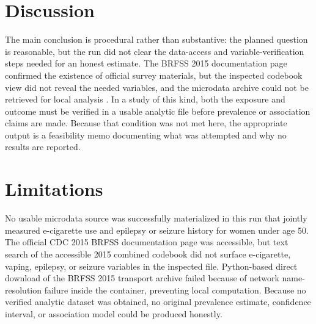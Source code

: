 \documentclass[11pt]{article}
\begin{document}
\section{Discussion}
The main conclusion is procedural rather than substantive: the planned question is reasonable, but the run did not clear the data-access and variable-verification steps needed for an honest estimate. The BRFSS 2015 documentation page confirmed the existence of official survey materials, but the inspected codebook view did not reveal the needed variables, and the microdata archive could not be retrieved for local analysis \cite{ref1} \cite{ref2} \cite{ref3}. In a study of this kind, both the exposure and outcome must be verified in a usable analytic file before prevalence or association claims are made. Because that condition was not met here, the appropriate output is a feasibility memo documenting what was attempted and why no results are reported.

\section{Limitations}
No usable microdata source was successfully materialized in this run that jointly measured e-cigarette use and epilepsy or seizure history for women under age 50. The official CDC 2015 BRFSS documentation page was accessible, but text search of the accessible 2015 combined codebook did not surface e-cigarette, vaping, epilepsy, or seizure variables in the inspected file. Python-based direct download of the BRFSS 2015 transport archive failed because of network name-resolution failure inside the container, preventing local computation. Because no verified analytic dataset was obtained, no original prevalence estimate, confidence interval, or association model could be produced honestly.



\end{document}
